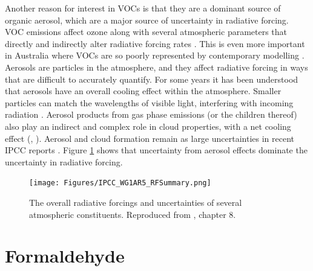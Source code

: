     Another reason for interest in VOCs is that they are a dominant source of 
    organic aerosol, which are a major source of uncertainty in radiative 
    forcing.
    VOC emissions affect ozone along with several atmospheric parameters that 
    directly and indirectly alter radiative forcing rates 
    \parencite[e.g.,][]{Arneth2008}.
    This is even more important in Australia where VOCs are so poorly 
    represented by contemporary modelling \parencite{Emmerson2016}.
    Aerosols are particles in the atmosphere, and they affect radiative forcing 
    in ways that are difficult to accurately quantify.
    For some years it has been understood that aerosols have an overall cooling 
    effect within the atmosphere.
    Smaller particles can match the wavelengths of visible light, interfering 
    with incoming radiation \parencite{Kanakidou2005}.
    Aerosol products from gas phase emissions (or the children thereof) also 
    play an indirect and complex role in cloud properties, with a net cooling 
    effect (\textcite{Kanakidou2005}, \textcite[Chapter 7, 8]{IPCC_AR5_WG1}).
    Aerosol and cloud formation remain as large uncertainties in recent IPCC 
    reports \parencite{IPCC_Chapter2}.
    Figure \ref{LR:VOCs:IsopCascade:RF:fig_IPCC_RF_AR5} shows that uncertainty 
    from aerosol effects dominate the uncertainty in radiative forcing.
    
    \begin{figure}
      \texttt{[image: Figures/IPCC\_WG1AR5\_RFSummary.png]}
      \caption{%
        The overall radiative forcings and uncertainties of several atmospheric constituents.
        Reproduced from \textcite{IPCC_AR5_WG1}, chapter 8.}
      \label{LR:VOCs:IsopCascade:RF:fig_IPCC_RF_AR5}
    \end{figure}    
    
    
    
\section{Formaldehyde}
\label{LR:HCHO}

